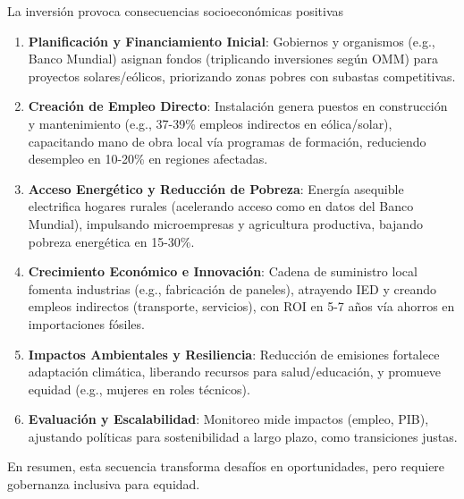 La inversión provoca  consecuencias socioeconómicas positivas
\begin{enumerate}
\item \textbf{Planificación y Financiamiento Inicial}: Gobiernos y organismos (e.g., Banco Mundial) asignan fondos (triplicando inversiones según OMM) para proyectos solares/eólicos, priorizando zonas pobres con subastas competitivas.
\item \textbf{Creación de Empleo Directo}: Instalación genera puestos en construcción y mantenimiento (e.g., 37-39\% empleos indirectos en eólica/solar), capacitando mano de obra local vía programas de formación, reduciendo desempleo en 10-20\% en regiones afectadas.
\item \textbf{Acceso Energético y Reducción de Pobreza}: Energía asequible electrifica hogares rurales (acelerando acceso como en datos del Banco Mundial), impulsando microempresas y agricultura productiva, bajando pobreza energética en 15-30\%.
\item \textbf{Crecimiento Económico e Innovación}: Cadena de suministro local fomenta industrias (e.g., fabricación de paneles), atrayendo IED y creando empleos indirectos (transporte, servicios), con ROI en 5-7 años vía ahorros en importaciones fósiles.
\item \textbf{Impactos Ambientales y Resiliencia}: Reducción de emisiones fortalece adaptación climática, liberando recursos para salud/educación, y promueve equidad (e.g., mujeres en roles técnicos).
\item \textbf{Evaluación y Escalabilidad}: Monitoreo mide impactos (empleo, PIB), ajustando políticas para sostenibilidad a largo plazo, como transiciones justas.
\end{enumerate}
En resumen, esta secuencia transforma desafíos en oportunidades, pero requiere gobernanza inclusiva para equidad.





